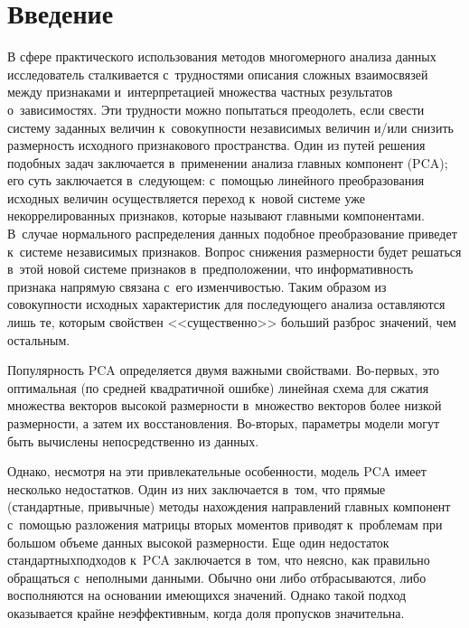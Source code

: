 \thispagestyle{headings}

\begin{multicols}{2}

\label{st\stat}

\section{Введение}

     В сфере практического использования методов многомерного анализа 
данных исследователь сталкивается с~трудностями описания сложных 
взаимосвязей между признаками и~интерпретацией множества частных 
результатов о~зависимостях. Эти трудности можно попытаться преодолеть, 
если свес\-ти систему заданных величин к~совокупности независимых величин 
и/или снизить размерность исходного признакового пространства. Один из 
путей решения подобных задач заключается в~применении анализа главных 
компонент (PCA); его суть заключается 
в~следующем: с~помощью линейного преобразования исходных величин 
осуществляется переход к~новой системе уже некоррелированных признаков, 
которые называют главными компонентами. В~случае нормального 
распределения данных подобное преобразование приведет к~сис\-те\-ме 
независимых признаков. Вопрос снижения размерности будет решаться в~этой 
новой системе признаков в~предположении, что информативность признака 
напрямую связана с~его изменчивостью. Таким образом из совокупности 
исходных характеристик для последующего анализа оставляются лишь те, 
которым свойствен <<существенно>> больший разброс значений, чем 
остальным.
     
     Популярность PCA определяется двумя важными свойствами.  
Во-пер\-вых, это оптимальная (по средней квадратичной ошибке) линейная 
схема для сжатия множества векторов высокой размерности в~множество 
векторов более низкой размерности, а затем их восстановления. Во-вто\-рых, 
параметры модели могут быть вычислены непосредственно из данных. 
     
     Однако, несмотря на эти привлекательные особенности, модель PCA 
имеет несколько недостатков. Один из них заключается в~том, что прямые\linebreak 
(стандартные, привычные) методы нахождения направле\-ний главных 
компонент с~помощью раз\-ложения матрицы вторых моментов приводят 
к~проб\-ле\-мам при большом объеме данных высокой размерности. Еще один 
недостаток стандартных\linebreak подходов к~PCA заключается в~том, что неясно, как 
правильно обращаться с~неполными данными. Обычно они либо 
отбрасываются, либо восполняются на основании имеющихся значений. 
Однако такой подход оказывается крайне неэффективным, когда доля 
пропусков значительна. 


\end{multicols}
